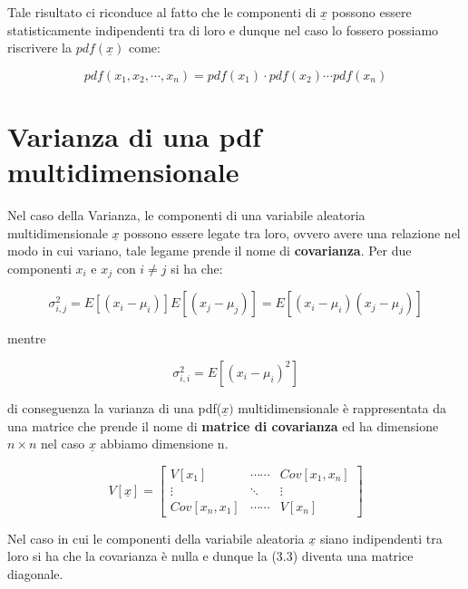 \noindent Tale risultato ci riconduce al fatto che le componenti di $\underline{x}$ possono essere statisticamente indipendenti tra di loro e dunque nel caso lo fossero possiamo riscrivere la $pdf(\underline{x})$ come:

\begin{equation}
	pdf(x_1,x_2,\cdots,x_n) = pdf(x_1)\cdot pdf(x_2) \cdots pdf(x_n)
\end{equation}



\section{Varianza di una pdf multidimensionale}

Nel caso della Varianza, le componenti di una variabile aleatoria multidimensionale $\underline{x}$ possono essere legate tra loro, ovvero avere una relazione nel modo in cui variano, tale legame prende il nome di \textbf{covarianza}. Per due componenti $x_i$ e $x_j$ con $i \neq j$ si ha che: 

\begin{equation}
	\sigma_{i,j}^2= E[(x_i - \mu_i)]E[(x_j - \mu_j)] = E[(x_i - \mu_i)(x_j - \mu_j)]
\end{equation}  	

\noindent mentre   	

\begin{equation}
	\sigma_{i,i}^2 = E[(x_i-\mu_i)^2]
\end{equation}
 
\noindent di conseguenza la varianza di una pdf($\underline{x})$ multidimensionale \`{e} rappresentata da una matrice che prende il nome di \textbf{matrice di covarianza} ed ha dimensione $n \times n$ nel caso $\underline{x}$ abbiamo dimensione n.

\begin{equation}
	V[\underline{x}] = \begin{bmatrix}
		V[x_1] & \cdots \cdots	& Cov[x_1,x_n] \\
		\vdots & \ddots & \vdots \\
		Cov[x_n,x_1] & \cdots \cdots & V[x_n]
	\end{bmatrix}
\end{equation}
\newline

\noindent Nel caso in cui le componenti della variabile aleatoria $\underline{x}$ siano indipendenti tra loro si ha che la covarianza \`{e} nulla e dunque la (3.3) diventa una matrice diagonale.


